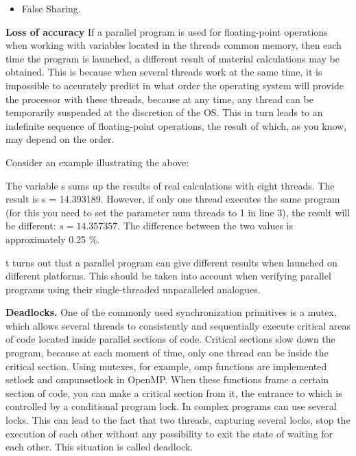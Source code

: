 {\begin{itemize}
		\item False Sharing.
	\end{itemize}
	\par\textbf{Loss of accuracy} If a parallel program is used for floating-point operations when working with variables located in the threads common memory, then each time the program is launched, a different result of material calculations may be obtained. This is because when several threads work at the same time, it is impossible to accurately predict in what order the operating system will provide the processor with these threads, because at any time, any thread can be temporarily suspended at the discretion of the OS. This in turn leads to an indefinite sequence of floating-point operations, the result of which, as you know, may depend on the order.
	\par Consider an example illustrating the above:
	\begin{figure}[H]
		
	\end{figure}
	\par The variable s sums up the results of real calculations with eight threads. The result is s = 14.393189. However, if only one thread executes the same program (for this you need to set the parameter num \textunderscore threads to 1 in line 3), the result will be different: $s=14.357357$. The difference between the two values is approximately 0.25 \%.
	\par t turns out that a parallel program can give different results when launched on different platforms. This should be taken into account when verifying parallel programs using their single-threaded unparalleled analogues.
	\par\textbf{Deadlocks.} One of the commonly used synchronization primitives is a mutex, which allows several threads to consistently and sequentially execute critical areas of code located inside parallel sections of code. Critical sections slow down the program, because at each moment of time, only one thread can be inside the critical section. Using mutexes, for example, omp functions are implemented \textunderscore set\textunderscore lock and omp\textunderscore unset\textunderscore lock in OpenMP. When these functions frame a certain section of code, you can make a critical section from it, the entrance to which is controlled by a conditional program lock. In complex programs can use several locks. This can lead to the fact that two threads, capturing several locks, stop the execution of each other without any possibility to exit the state of waiting for each other. This situation is called deadlock.
}
